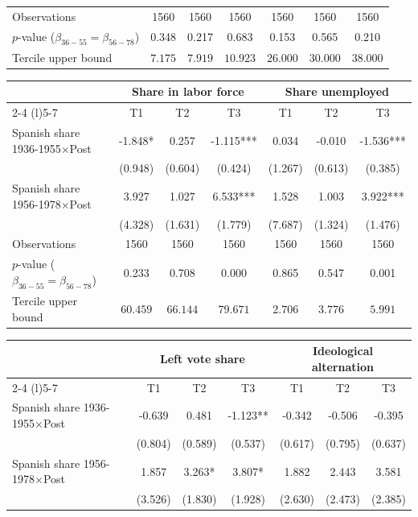 \begin{table}[!h]
\begin{tabular*}{\textwidth}{l@{\extracolsep{\fill}}cccccc}
\addlinespace
Observations & 1560 & 1560 & 1560 & 1560 & 1560 & 1560\\
$p$-value ($\beta_{36{-}55} = \beta_{56{-}78}$) & 0.348 & 0.217 & 0.683 & 0.153 & 0.565 & 0.210\\
Tercile upper bound & $7.175$ & $7.919$ & $10.923$ & $26.000$ & $30.000$ & $38.000$\\
\hline
\end{tabular*}
\begin{tabular*}{\textwidth}{l@{\extracolsep{\fill}}cccccc}
 & \multicolumn{3}{c}{Share in labor force} & \multicolumn{3}{c}{Share unemployed} \\
\cmidrule(l){2-4} \cmidrule(l){5-7}
  & T1 & T2 & T3 & T1  & T2  & T3 \\
\hline
Spanish share 1936-1955$\times$Post & -1.848* & 0.257 & -1.115*** & 0.034 & -0.010 & -1.536***\\
 & (0.948) & (0.604) & (0.424) & (1.267) & (0.613) & (0.385)\\
Spanish share 1956-1978$\times$Post & 3.927 & 1.027 & 6.533*** & 1.528 & 1.003 & 3.922***\\
 & (4.328) & (1.631) & (1.779) & (7.687) & (1.324) & (1.476)\\

\addlinespace
Observations & 1560 & 1560 & 1560 & 1560 & 1560 & 1560\\
$p$-value ($\beta_{36{-}55} = \beta_{56{-}78}$) & 0.233 & 0.708 & 0.000 & 0.865 & 0.547 & 0.001\\
Tercile upper bound & $60.459$ & $66.144$ & $79.671$ & $2.706$ & $3.776$ & $5.991$\\
\hline
\end{tabular*}
\begin{tabular*}{\textwidth}{l@{\extracolsep{\fill}}cccccc}
 & \multicolumn{3}{c}{Left vote share} & \multicolumn{3}{c}{Ideological alternation} \\
\cmidrule(l){2-4} \cmidrule(l){5-7}
  & T1 & T2 & T3 & T1  & T2  & T3 \\
\hline
Spanish share 1936-1955$\times$Post & -0.639 & 0.481 & -1.123** & -0.342 & -0.506 & -0.395\\
 & (0.804) & (0.589) & (0.537) & (0.617) & (0.795) & (0.637)\\
Spanish share 1956-1978$\times$Post & 1.857 & 3.263* & 3.807* & 1.882 & 2.443 & 3.581\\
 & (3.526) & (1.830) & (1.928) & (2.630) & (2.473) & (2.385)\\


\end{tabular*}
\end{table}
